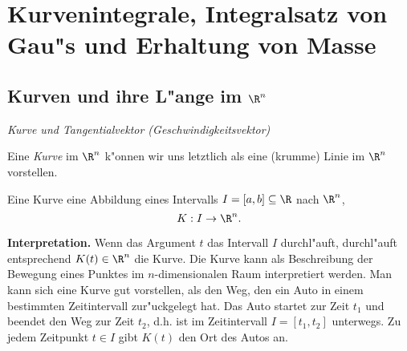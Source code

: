 



\section{Kurvenintegrale, Integralsatz von Gau"s und Erhaltung von Masse}

  
\subsection{Kurven und ihre L"ange im $\R^n$}
\label{kurvexxx}
{\it Kurve und Tangentialvektor (Geschwindigkeitsvektor)}\par

Eine \emph{Kurve} im $\R^n$ k"onnen wir uns letztlich als eine (krumme) Linie im 
$\R^n$ vorstellen. 

\begin{sdefi} 
Eine Kurve eine Abbildung eines Intervalls $I=[a,b]\subseteq \R$ nach $\R^n$,
$$ K: I\rightarrow \R^n.$$
\end{sdefi}
{\bf Interpretation.} Wenn das Argument $t$ das Intervall $I$ durchl"auft, 
durchl"auft entsprechend $K(t)\in\R^n$ die Kurve.  Die Kurve kann als Beschreibung der Bewegung eines
Punktes im $n$-dimensionalen Raum interpretiert werden. Man kann sich eine Kurve 
gut vorstellen, als den Weg, den ein Auto in einem bestimmten Zeitintervall 
zur"uckgelegt hat. Das Auto startet zur Zeit $t_1$ und beendet den Weg zur Zeit 
$t_2$, d.h. ist im Zeitintervall $I=[t_1, t_2]$ unterwegs. Zu jedem Zeitpunkt $t\in I$
gibt $K(t)$ den Ort des Autos an.

